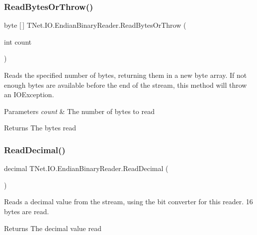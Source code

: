 \subsubsection{\texorpdfstring{Read\+Bytes\+Or\+Throw()}{ReadBytesOrThrow()}}
{\footnotesize\ttfamily byte \mbox{[}$\,$\mbox{]} T\+Net.\+I\+O.\+Endian\+Binary\+Reader.\+Read\+Bytes\+Or\+Throw (\begin{DoxyParamCaption}\item[{int}]{count }\end{DoxyParamCaption})}



Reads the specified number of bytes, returning them in a new byte array. If not enough bytes are available before the end of the stream, this method will throw an I\+O\+Exception. 


\begin{DoxyParams}{Parameters}
{\em count} & The number of bytes to read\\
\hline
\end{DoxyParams}
\begin{DoxyReturn}{Returns}
The bytes read
\end{DoxyReturn}
\mbox{\label{class_t_net_1_1_i_o_1_1_endian_binary_reader_aa4b6ba813801ec1f4587396c5ab1be3c}} 
\subsubsection{\texorpdfstring{Read\+Decimal()}{ReadDecimal()}}
{\footnotesize\ttfamily decimal T\+Net.\+I\+O.\+Endian\+Binary\+Reader.\+Read\+Decimal (\begin{DoxyParamCaption}{ }\end{DoxyParamCaption})}



Reads a decimal value from the stream, using the bit converter for this reader. 16 bytes are read. 

\begin{DoxyReturn}{Returns}
The decimal value read
\end{DoxyReturn}
\mbox{\label{class_t_net_1_1_i_o_1_1_endian_binary_reader_a17a0fbf3fff03a507af84dbf824d4915}} 
